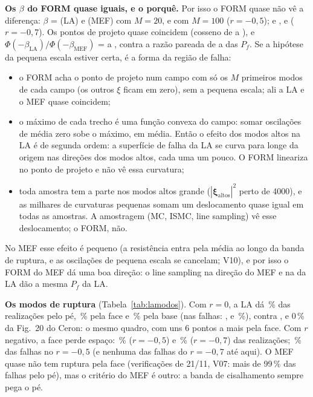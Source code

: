 \documentclass[11pt,a4paper]{article}
\newcommand{\xib}{\bm\xi}
\begin{document}
\textbf{Os $\beta$ do FORM quase iguais, e o porquê.} Por isso o FORM quase não vê a diferença: $\beta$ =
\lmBetaLaRaMv{} (LA) e \lmBetaMefRaMv{} (MEF) com $M = 20$, \lmBetaLaRaMc{} e \lmBetaMefRaMc{} com $M = 100$
($r = -0{,}5$); \lmBetaLaRbMv{} e \lmBetaMefRbMv, \lmBetaLaRbMc{} e \lmBetaMefRbMc{} ($r = -0{,}7$). Os pontos de
projeto quase coincidem (cosseno de \lmCosRbMc{} a \lmCosRaMv), e $\Phi(-\beta_\text{LA})/\Phi(-\beta_\text{MEF})$ =
\lmPhiRazRbMv{} a \lmPhiRazRaMc, contra a razão pareada de \lmLsRazRbMin{} a \lmIsRazRaMax{} das $P_f$. Se a hipótese
da pequena escala estiver certa, é a forma da região de falha:
\begin{itemize}
  \item o FORM acha o ponto de projeto num campo com só os $M$ primeiros modos de cada campo (os outros $\xi$ ficam em
    zero), sem a pequena escala; ali a LA e o MEF quase coincidem;
  \item o máximo de cada trecho é uma função convexa do campo: somar oscilações de média zero sobe o máximo, em média.
    Então o efeito dos modos altos na LA é de segunda ordem: a superfície de falha da LA se curva para longe da origem
    nas direções dos modos altos, cada uma um pouco. O FORM lineariza no ponto de projeto e não vê essa curvatura;
  \item toda amostra tem a parte nos modos altos grande ($|\xib_\text{altos}|^2$ perto de 4000), e as milhares de
    curvaturas pequenas somam um deslocamento quase igual em todas as amostras. A amostragem (MC, ISMC, line sampling)
    vê esse deslocamento; o FORM, não.
\end{itemize}
No MEF esse efeito é pequeno (a resistência entra pela média ao longo da banda de ruptura, e as oscilações de
pequena escala se cancelam; V10), e por isso o FORM do MEF dá uma boa direção: o line sampling na direção do MEF e na
da LA dão a mesma $P_f$ da LA.


\textbf{Os modos de ruptura} (Tabela~\ref{tab:lamodos}). Com $r = 0$, a LA dá \lmModoZPe\,\% das realizações pelo pé,
\lmModoZFace\,\% pela face e \lmModoZBase\,\% pela base (nas falhas: \lmModoFZPe, \lmModoFZFace{} e \lmModoFZBase\,\%),
contra \lmCeronPe, \lmCeronFace{} e 0\,\% da Fig.~20 do Ceron: o mesmo quadro, com uns 6 pontos a mais pela face. Com
$r$ negativo, a face perde espaço: \lmModoRaFace\,\% ($r = -0{,}5$) e \lmModoRbFace\,\% ($r = -0{,}7$) das realizações;
\lmModoFRaFace\,\% das falhas no $r = -0{,}5$ (e nenhuma das \lmDirRbFal{} falhas do $r = -0{,}7$ até aqui). O MEF quase
não tem ruptura pela face (verificações de 21/11, V07: mais de 99\,\% das falhas pelo pé), mas o critério do MEF é
outro: a banda de cisalhamento sempre pega o pé.
\end{document}
